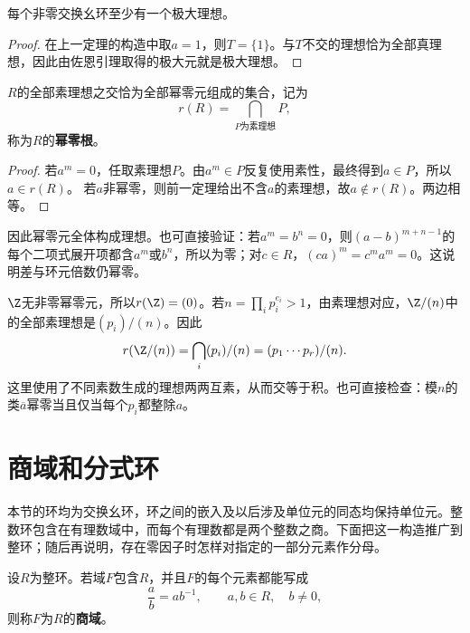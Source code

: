 \begin{corollary}
每个非零交换幺环至少有一个极大理想。
\end{corollary}
\begin{proof}
在上一定理的构造中取$a=1$，则$T=\{1\}$。与$T$不交的理想恰为全部真理想，因此由佐恩引理取得的极大元就是极大理想。
\end{proof}

\begin{corollary}
$R$的全部素理想之交恰为全部幂零元组成的集合，记为
\[
r(R)=\bigcap_{P\text{为素理想}}P,
\]
称为$R$的\textbf{幂零根}。
\end{corollary}
\begin{proof}
若$a^m=0$，任取素理想$P$。由$a^m\in P$反复使用素性，最终得到$a\in P$，所以$a\in r(R)$。
若$a$非幂零，则前一定理给出不含$a$的素理想，故$a\notin r(R)$。两边相等。
\end{proof}

因此幂零元全体构成理想。也可直接验证：若$a^m=b^n=0$，则$(a-b)^{m+n-1}$的每个二项式展开项都含$a^m$或$b^n$，所以为零；对$c\in R$，$(ca)^m=c^ma^m=0$。这说明差与环元倍数仍幂零。

\begin{example}
$\Z$无非零幂零元，所以$r(\Z)=(0)$。若$n=\prod_i p_i^{e_i}>1$，由素理想对应，$\Z/(n)$中的全部素理想是$(p_i)/(n)$。因此
\[
r(\Z/(n))=\bigcap_i(p_i)/(n)=(p_1\cdots p_r)/(n).
\]
这里使用了不同素数生成的理想两两互素，从而交等于积。也可直接检查：模$n$的类$\overline a$幂零当且仅当每个$p_i$都整除$a$。
\end{example}


\section{商域和分式环}

本节的环均为交换幺环，环之间的嵌入及以后涉及单位元的同态均保持单位元。整数环包含在有理数域中，而每个有理数都是两个整数之商。下面把这一构造推广到整环；随后再说明，存在零因子时怎样对指定的一部分元素作分母。

\begin{definition}
设$R$为整环。若域$F$包含$R$，并且$F$的每个元素都能写成
\[
\frac ab=ab^{-1},\qquad a,b\in R,\quad b\ne0,
\]
则称$F$为$R$的\textbf{商域}。
\end{definition}

